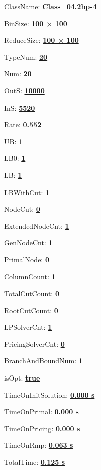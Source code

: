 \documentclass[11pt]{article}
\begin{document}
\pagestyle{empty}


ClassName: \underline{\textbf{Class_04.2bp-4}}
\par
BinSize: \underline{\textbf{100 × 100}}
\par
ReduceSize: \underline{\textbf{100 × 100}}
\par
TypeNum: \underline{\textbf{20}}
\par
Num: \underline{\textbf{20}}
\par
OutS: \underline{\textbf{10000}}
\par
InS: \underline{\textbf{5520}}
\par
Rate: \underline{\textbf{0.552}}
\par
UB: \underline{\textbf{1}}
\par
LB0: \underline{\textbf{1}}
\par
LB: \underline{\textbf{1}}
\par
LBWithCut: \underline{\textbf{1}}
\par
NodeCut: \underline{\textbf{0}}
\par
ExtendedNodeCnt: \underline{\textbf{1}}
\par
GenNodeCnt: \underline{\textbf{1}}
\par
PrimalNode: \underline{\textbf{0}}
\par
ColumnCount: \underline{\textbf{1}}
\par
TotalCutCount: \underline{\textbf{0}}
\par
RootCutCount: \underline{\textbf{0}}
\par
LPSolverCnt: \underline{\textbf{1}}
\par
PricingSolverCnt: \underline{\textbf{0}}
\par
BranchAndBoundNum: \underline{\textbf{1}}
\par
isOpt: \underline{\textbf{true}}
\par
TimeOnInitSolution: \underline{\textbf{0.000 s}}
\par
TimeOnPrimal: \underline{\textbf{0.000 s}}
\par
TimeOnPricing: \underline{\textbf{0.000 s}}
\par
TimeOnRmp: \underline{\textbf{0.063 s}}
\par
TotalTime: \underline{\textbf{0.125 s}}
\par
\newpage
\end{document}
